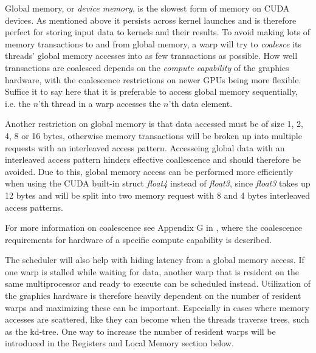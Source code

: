 Global memory, or \textit{device memory}, is the slowest form of memory on CUDA
devices. As mentioned above it persists across kernel launches and is therefore
perfect for storing input data to kernels and their results. To avoid making
lots of memory transactions to and from global memory, a warp will try to
\textit{coalesce} its threads' global memory accesses into as few transactions
as possible. How well transactions are coalesced depends on the \textit{compute
  capability} of the graphics hardware, with the coalescence restrictions on
newer GPUs being more flexible. Suffice it to say here that it is preferable to
access global memory sequentially, i.e. the $n$'th thread in a warp accesses the
$n$'th data element.


Another restriction on global memory is that data accessed must be of size 1, 2,
4, 8 or 16 bytes, otherwise memory transactions will be broken up into multiple
requests with an interleaved access pattern. Accesseing global data with an
interleaved access pattern hinders effective coallescence and should therefore
be avoided. Due to this, global memory access can be performed more efficiently
when using the CUDA built-in struct \textit{float4} instead of \textit{float3},
since \textit{float3} takes up 12 bytes and will be split into two memory
request with 8 and 4 bytes interleaved access patterns.

For more information on coalescence see Appendix G in , where
the coalescence requirements for hardware of a specific compute capability is
described.


The scheduler will also help with hiding latency from a global memory access. If
one warp is stalled while waiting for data, another warp that is resident on the
same multiprocessor and ready to execute can be scheduled instead. Utilization
of the graphics hardware is therefore heavily dependent on the number of
resident warps and maximizing these can be important. Especially in cases where
memory accesses are scattered, like they can become when the threads traverse
trees, such as the kd-tree. One way to increase the number of resident warps
will be introduced in the Registers and Local Memory section below.



